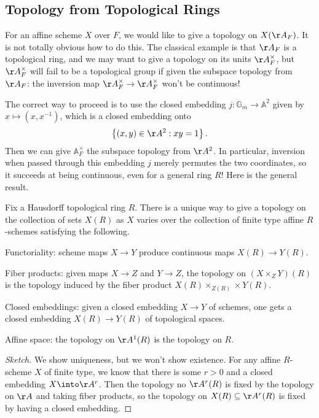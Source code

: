 \documentclass{article}
\begin{document}
\subsection{Topology from Topological Rings}
For an affine scheme $X$ over $F$, we would like to give a topology on $X(\AA_F)$. It is not totally obvious how to do this. The classical example is that $\AA_F$ is a topological ring, and we may want to give a topology on its units $\AA_F^\times$, but $\AA_F^\times$ will fail to be a topological group if given the subspace topology from $\AA_F$: the inversion map $\AA_F^\times\to\AA_F^\times$ won't be continuous!

The correct way to proceed is to use the closed embedding $j\colon\mathbb G_m\to\mathbb A^2$ given by $x\mapsto\left(x,x^{-1}\right)$, which is a closed embedding onto
\[\left\{(x,y)\in\AA^2:xy=1\right\}.\]
Then we can give $\mathbb A_F^\times$ the subspace topology from $\AA^2$. In particular, inversion when passed through this embedding $j$ merely permutes the two coordinates, so it succeeds at being continuous, even for a general ring $R$! Here is the general result.
\begin{theorem}
	Fix a Hausdorff topological ring $R$. There is a unique way to give a topology on the collection of sets $X(R)$ as $X$ varies over the collection of finite type affine $R$-schemes satisfying the following.
	\begin{listalph}
		\item Functoriality: scheme maps $X\to Y$ produce continuous maps $X(R)\to Y(R)$.
		\item Fiber products: given maps $X\to Z$ and $Y\to Z$, the topology on $(X\times_ZY)(R)$ is the topology induced by the fiber product $X(R)\times_{Z(R)}\times Y(R)$.
		\item Closed embeddings: given a closed embedding $X\to Y$ of schemes, one gets a closed embedding $X(R)\to Y(R)$ of topological spaces.
		\item Affine space: the topology on $\AA^1(R)$ is the topology on $R$.
	\end{listalph}
\end{theorem}
\begin{proof}[Sketch]
	We show uniqueness, but we won't show existence. For any affine $R$-scheme $X$ of finite type, we know that there is some $r>0$ and a closed embedding $X\into\AA^r$. Then the topology no $\AA^r(R)$ is fixed by the topology on $\AA$ and taking fiber products, so the topology on $X(R)\subseteq\AA^r(R)$ is fixed by having a closed embedding.
\end{proof}
\end{document}
